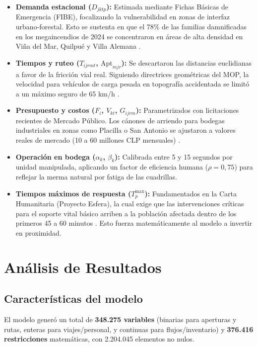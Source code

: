 \documentclass[letterpaper]{article}
\begin{document}
\begin{flushleft}
\begin{itemize}[leftmargin=2em, itemsep=3pt]
  \item \textbf{Demanda estacional ($D_{jktp}$):} Estimada mediante Fichas Básicas de Emergencia (FIBE), focalizando la vulnerabilidad en zonas de interfaz urbano-forestal. Esto se sustenta en que el 78\% de las familias damnificadas en los megaincendios de 2024 se concentraron en áreas de alta densidad en Viña del Mar, Quilpué y Villa Alemana \cite{mdsf2024fibe}.
  \item \textbf{Tiempos y ruteo ($T_{ijrmt}$, $\mathrm{Apt}_{mjr}$):} Se descartaron las distancias euclidianas a favor de la fricción vial real. Siguiendo directrices geométricas del MOP, la velocidad para vehículos de carga pesada en topografía accidentada se limitó a un máximo seguro de 65 km/h \cite{mop2020}.
  \item \textbf{Presupuesto y costos ($F_i$, $V_{kt}$, $G_{ijrm}$):} Parametrizados con licitaciones recientes de Mercado Público. Los cánones de arriendo para bodegas industriales en zonas como Placilla o San Antonio se ajustaron a valores reales de mercado (10 a 60 millones CLP mensuales) \cite{chilecompra2025}.
  \item \textbf{Operación en bodega ($\alpha_k$, $\beta_k$):} Calibrada entre 5 y 15 segundos por unidad manipulada, aplicando un factor de eficiencia humana ($\rho = 0{,}75$) para reflejar la merma natural por fatiga de las cuadrillas.
  \item \textbf{Tiempos máximos de respuesta ($T^{\max}_p$):} Fundamentados en la Carta Humanitaria (Proyecto Esfera), la cual exige que las intervenciones críticas para el soporte vital básico arriben a la población afectada dentro de los primeros 45 a 60 minutos \cite{esfera2018}. Esto fuerza matemáticamente al modelo a invertir en proximidad.
\end{itemize}

\section{Análisis de Resultados}

\subsection{Características del modelo}

El modelo generó un total de \textbf{348.275 variables} (binarias para aperturas y rutas, enteras para viajes/personal, y continuas para flujos/inventario) y \textbf{376.416 restricciones} matemáticas, con 2.204.045 elementos no nulos.


\end{flushleft}
\end{document}

